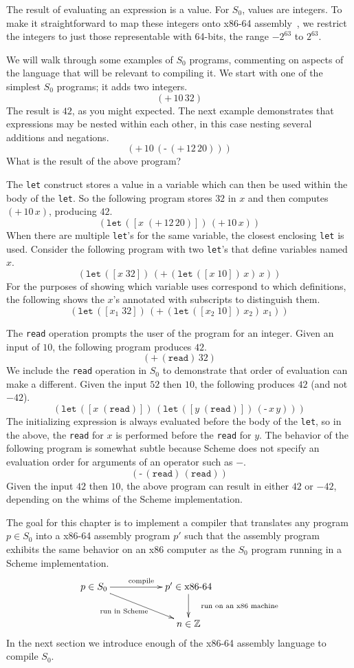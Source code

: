 \documentclass[12pt]{book}
\newcommand{\key}[1]{\texttt{#1}}
\newcommand{\READ}{(\key{read})}
\newcommand{\UNIOP}[2]{(\key{#1}\,#2)}
\newcommand{\BINOP}[3]{(\key{#1}\,#2\,#3)}
\newcommand{\LET}[3]{(\key{let}\,([#1\;#2])\,#3)}
\begin{document}
The result of evaluating an expression is a value.  For $S_0$, values
are integers. To make it straightforward to map these integers onto
x86-64 assembly~\citep{Matz:2013aa}, we restrict the integers to just
those representable with 64-bits, the range $-2^{63}$ to $2^{63}$.

We will walk through some examples of $S_0$ programs, commenting on
aspects of the language that will be relevant to compiling it.  We
start with one of the simplest $S_0$ programs; it adds two integers.
\[
\BINOP{+}{10}{32}
\]
The result is $42$, as you might expected. 
%
The next example demonstrates that expressions may be nested within
each other, in this case nesting several additions and negations.
\[
\BINOP{+}{10}{ \UNIOP{-}{ \BINOP{+}{12}{20} } }
\]
What is the result of the above program?

The \key{let} construct stores a value in a variable which can then be
used within the body of the \key{let}. So the following program stores
$32$ in $x$ and then computes $\BINOP{+}{10}{x}$, producing $42$.
\[
\LET{x}{ \BINOP{+}{12}{20} }{ \BINOP{+}{10}{x} } 
\]
When there are multiple \key{let}'s for the same variable, the closest
enclosing \key{let} is used. Consider the following program with two
\key{let}'s that define variables named $x$.
\[
\LET{x}{32}{ \BINOP{+}{ \LET{x}{10}{x} }{ x } }
\]
For the purposes of showing which variable uses correspond to which
definitions, the following shows the $x$'s annotated with subscripts
to distinguish them.
\[
\LET{x_1}{32}{ \BINOP{+}{ \LET{x_2}{10}{x_2} }{ x_1 } }
\]

The \key{read} operation prompts the user of the program for an
integer. Given an input of $10$, the following program produces $42$.
\[
\BINOP{+}{(\key{read})}{32}
\]
We include the \key{read} operation in $S_0$ to demonstrate that order
of evaluation can make a different. Given the input $52$ then $10$,
the following produces $42$ (and not $-42$).
\[
\LET{x}{\READ}{ \LET{y}{\READ}{ \BINOP{-}{x}{y} } }
\]
The initializing expression is always evaluated before the body of the
\key{let}, so in the above, the \key{read} for $x$ is performed before
the \key{read} for $y$.
%
The behavior of the following program is somewhat subtle because
Scheme does not specify an evaluation order for arguments of an
operator such as $-$.
\[
\BINOP{-}{\READ}{\READ}
\]
Given the input $42$ then $10$, the above program can result in either
$42$ or $-42$, depending on the whims of the Scheme implementation.

The goal for this chapter is to implement a compiler that translates
any program $p \in S_0$ into a x86-64 assembly program $p'$ such that
the assembly program exhibits the same behavior on an x86 computer as
the $S_0$ program running in a Scheme implementation.
\[
\xymatrix{
p \in S_0  \ar[rr]^{\text{compile}} \ar[drr]_{\text{run in Scheme}\quad}   &&  p' \in \text{x86-64} \ar[d]^{\quad\text{run on an x86 machine}}\\
& & n \in \mathbb{Z}   
}
\]
In the next section we introduce enough of the x86-64 assembly
language to compile $S_0$.
\end{document}
